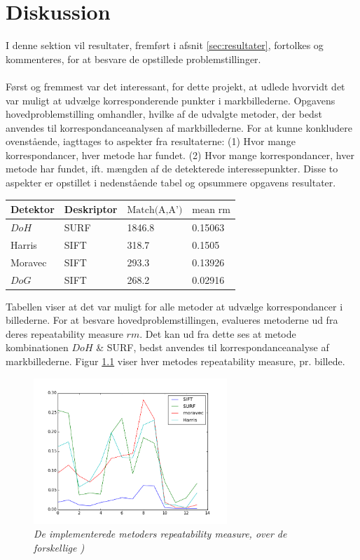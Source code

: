\chapter{Diskussion}
I denne sektion vil resultater, fremført i afsnit \ref{sec:resultater}, fortolkes og kommenteres, for at besvare de opstillede problemstillinger. \\ \\
Først og fremmest var det interessant, for dette projekt, at udlede hvorvidt det var muligt at udvælge korresponderende punkter i markbillederne. Opgavens hovedproblemstilling omhandler, hvilke af de udvalgte metoder, der bedst anvendes til korrespondanceanalysen af markbillederne. For at kunne konkludere ovenstående, iagttages to aspekter fra resultaterne: (1) Hvor mange korrespondancer, hver metode har fundet. (2) Hvor mange korrespondancer, hver metode har fundet, ift. mængden af de detekterede interessepunkter. Disse to aspekter er opstillet i nedenstående tabel og opsummere opgavens resultater.
\begin{center}
    \begin{tabular}{ | l | l | l | l |}
    \hline
    Detektor & Deskriptor & $\text{Match(A,A')}$ & $\text{mean rm}$ \\ \hline
    $DoH$ & SURF & 1846.8 & 0.15063 \\ \hline  
    Harris & SIFT & 318.7 & 0.1505 \\ \hline    
    Moravec & SIFT & 293.3 & 0.13926 \\ \hline    
    $DoG$ & SIFT & 268.2 & 0.02916 \\ \hline         
    \end{tabular}
    \label{table:tab}
\end{center}
Tabellen viser at det var muligt for alle metoder at udvælge korrespondancer i billederne. For at besvare hovedproblemstillingen, evalueres metoderne ud fra deres repeatability measure $rm$. Det kan ud fra dette ses at metode kombinationen $DoH$ \& SURF, bedst anvendes til korrespondanceanalyse af markbillederne. Figur \ref{fig:graf} viser hver metodes repeatability measure, pr. billede.
\begin{figure}[H]
    \centering
    \includegraphics[width=0.65\textwidth]{fig/repeatabilitygraph.png}
     \vspace{-1em}
    \begin{center}        
     \caption{{\footnotesize \textit{
De implementerede metoders repeatability measure, over de forskellige )}}}
    \label{fig:graf}
     \end{center}
       \vspace{-2.5em}
  \end{figure}
